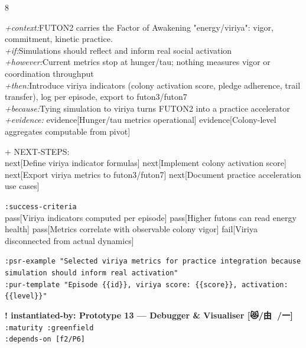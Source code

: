 \documentclass[landscape]{article}
\newcommand{\flexitag}[1]{\textcolor[gray]{0.35}{\textit{#1}}}
\newenvironment{devmapgreenfield}{%
  \def\FrameCommand{\colorbox{devmapgreenfieldbg}}%
  \setlength{\fboxsep}{2pt}%
  \MakeFramed{\advance\hsize-\width \FrameRestore}%
}{\endMakeFramed}
\begin{document}
\begin{paracol}{8}
\begin{devmapgreenfield}
  \flexitag{+context:}FUTON2 carries the Factor of Awakening "energy/viriya": vigor, commitment, kinetic practice.\\
  \flexitag{+if:}Simulations should reflect and inform real social activation\\
  \flexitag{+however:}Current metrics stop at hunger/tau; nothing measures vigor or coordination throughput\\
  \flexitag{+then:}Introduce viriya indicators (colony activation score, pledge adherence, trail transfer), log per episode, export to futon3/futon7\\
  \flexitag{+because:}Tying simulation to viriya turns FUTON2 into a practice accelerator\\
  \flexitag{+evidence:} evidence[Hunger/tau metrics operational] evidence[Colony-level aggregates computable from pivot]\\
\par
  + NEXT-STEPS:\\
    next[Define viriya indicator formulas] next[Implement colony activation score] next[Export viriya metrics to futon3/futon7] next[Document practice acceleration use cases]\\
\par
  \texttt{:\allowbreak{}success-\allowbreak{}criteria}\\
    pass[Viriya indicators computed per episode] pass[Higher futons can read energy health] pass[Metrics correlate with observable colony vigor] fail[Viriya disconnected from actual dynamics]\\
\par
  \texttt{:\allowbreak{}psr-\allowbreak{}example "Selected viriya metrics for practice integration because simulation should inform real activation"}\\
  \texttt{:\allowbreak{}pur-\allowbreak{}template "Episode \{\{id\}\},\allowbreak{} viriya score:\allowbreak{} \{\{score\}\},\allowbreak{} activation:\allowbreak{} \{\{level\}\}"}\\
\par
\par
\end{devmapgreenfield}
\begin{devmapgreenfield}
\textbf{! instantiated-by: Prototype 13 — Debugger \& Visualiser [😻/由 🚢/一]}\\
  \texttt{:\allowbreak{}maturity :\allowbreak{}greenfield}\\
  \texttt{:\allowbreak{}depends-\allowbreak{}on [f2/\allowbreak{}P6]}\\

\end{devmapgreenfield}
\end{paracol}
\end{document}
